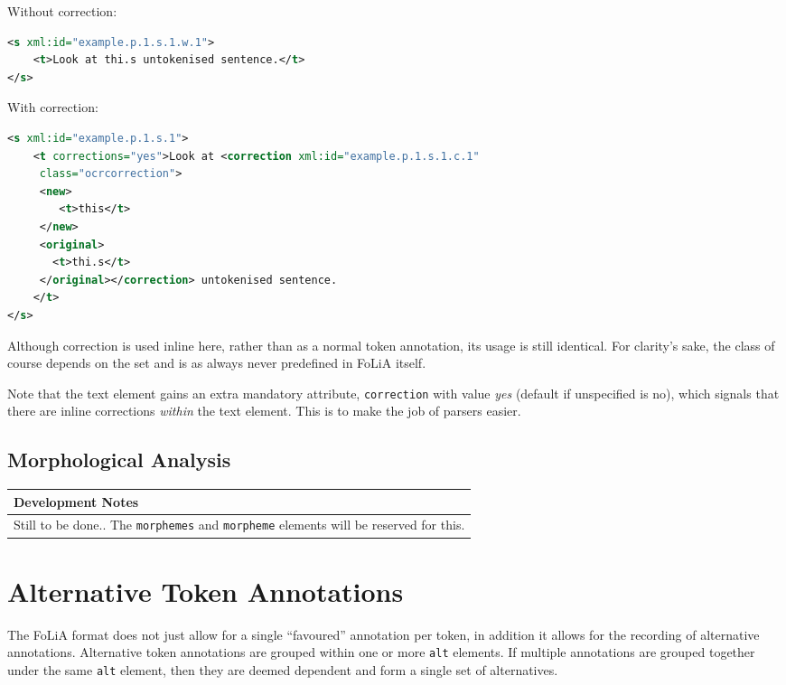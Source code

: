 \documentclass[a4paper,12pt]{report}
\newenvironment{devnotes}
{
\begin{center}
    \begin{tabular}[h!]{|p{0.8\textwidth}|}
    \hline
    {\bf Development Notes}\\\hline}
{   \\\hline
    \end{tabular}
\end{center}}
\begin{document}
Without correction:

\begin{lstlisting}[language=xml]
<s xml:id="example.p.1.s.1.w.1">
    <t>Look at thi.s untokenised sentence.</t>
</s>            
\end{lstlisting}

With correction:

\begin{lstlisting}[language=xml]
<s xml:id="example.p.1.s.1">
    <t corrections="yes">Look at <correction xml:id="example.p.1.s.1.c.1"
     class="ocrcorrection">
     <new>
        <t>this</t>
     </new>
     <original>
       <t>thi.s</t>
     </original></correction> untokenised sentence.
    </t>
</s>                         
\end{lstlisting}

Although correction is used inline here, rather than as a normal token annotation, its usage is still identical. For clarity's sake, the class of course depends on the set and is as always never predefined in FoLiA itself.

Note that the text element gains an extra mandatory attribute, \texttt{correction} with value \emph{yes} (default if unspecified is no), which signals that there are inline corrections \emph{within} the text element. This is to make the job of parsers easier.

\subsection{Morphological Analysis}

\begin{devnotes}
Still to be done.. The \texttt{morphemes} and \texttt{morpheme} elements will be reserved for this.
\end{devnotes}


\section{Alternative Token Annotations}
\label{sec:alternatives}

The FoLiA format does not just allow for a single ``favoured'' annotation per token, in addition it allows for the recording of alternative annotations. Alternative token annotations are grouped within one or more \texttt{alt} elements. If multiple annotations are grouped together under the same \texttt{alt} element, then they are deemed dependent and form a single set of alternatives.
\end{document}

